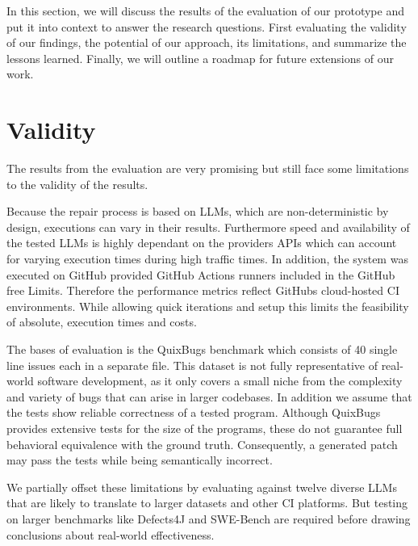 In this section, we will discuss the results of the evaluation of our prototype and put it into context to answer the research questions. First evaluating the validity of our findings, the potential of our approach, its limitations, and summarize the lessons learned. Finally, we will outline a roadmap for future extensions of our work.

\section{Validity} \label{section:validity}
The results from the evaluation are very promising but still face some limitations to the validity of the results.

Because the repair process is based on LLMs, which are non-deterministic by design, executions can vary in their results. Furthermore speed and availability of the tested LLMs is highly dependant on the providers APIs which can account for varying execution times during high traffic times. In addition, the system was executed on GitHub provided GitHub Actions runners included in the GitHub free Limits. Therefore the performance metrics reflect GitHubs cloud-hosted CI environments. While allowing quick iterations and setup this limits the feasibility of absolute, execution times and costs.

The bases of evaluation is the QuixBugs benchmark which consists of 40 single line issues each in a separate file. This dataset is not fully representative of real-world software development, as it only covers a small niche from the complexity and variety of bugs that can arise in larger codebases.
In addition we assume that the tests show reliable correctness of a tested program. Although QuixBugs provides extensive tests for the size of the programs, these do not guarantee full behavioral equivalence with the ground truth. Consequently, a generated patch may pass the tests while being semantically incorrect.

We partially offset these limitations by evaluating against twelve diverse LLMs that are likely to translate to larger datasets and other CI platforms. But testing on larger benchmarks like Defects4J and SWE-Bench are required before drawing conclusions about real-world effectiveness.

